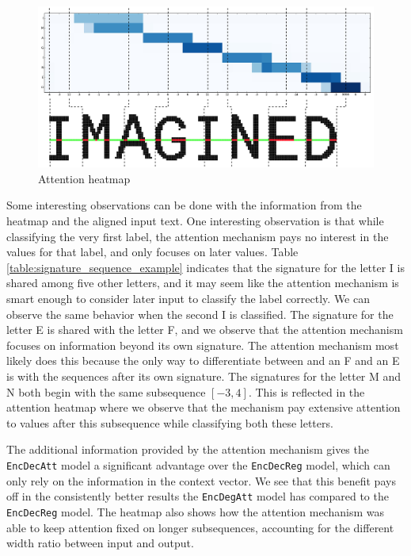 \begin{figure}[ht]
    \centering
    \includegraphics[width=1\textwidth]{fig/conclusion/attention_illustrated.png}
    \caption{Attention heatmap}
    \label{fig:attention_heatmap}
\end{figure}

Some interesting observations can be done with the information from the heatmap and the aligned input text. One interesting observation is that while classifying the very first label, the attention mechanism pays no interest in the values for that label, and only focuses on later values. Table \ref{table:signature_sequence_example} indicates that the signature for the letter I is shared among five other letters, and it may seem like the attention mechanism is smart enough to consider later input to classify the label correctly. We can observe the same behavior when the second I is classified. The signature for the letter E is shared with the letter F, and we observe that the attention mechanism focuses on information beyond its own signature. The attention mechanism most likely does this because the only way to differentiate between and an F and an E is with the sequences after its own signature. The signatures for the letter M and N both begin with the same subsequence \([-3, 4]\). This is reflected in the attention heatmap where we observe that the mechanism pay extensive attention to values after this subsequence while classifying both these letters.

The additional information provided by the attention mechanism gives the {\tt EncDecAtt} model a significant advantage over the {\tt EncDecReg} model, which can only rely on the information in the context vector. We see that this benefit pays off in the consistently better results the {\tt EncDegAtt} model has compared to the {\tt EncDecReg} model. The heatmap also shows how the attention mechanism was able to keep attention fixed on longer subsequences, accounting for the different width ratio between input and output.